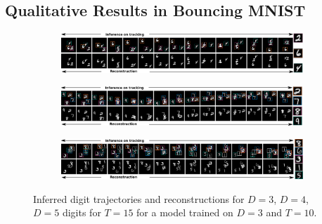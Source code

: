 \documentclass[anonymous=false, %
               format=acmsmall, %
               review=true, %
               screen=true, %
               nonacm=true]{acmart}
\theoremstyle{definition}
\begin{document}
\subsection{Qualitative Results in Bouncing MNIST}
\label{appendix:samples-mnnist}
\begin{figure}[!h]
  \centering
  \begin{subfigure}[t]{1.0\textwidth}
  \includegraphics[width=1.0\textwidth]{figures/bmnist-3digits-samples.pdf}
  \end{subfigure}
  \begin{subfigure}[t]{1.0\textwidth}
  \includegraphics[width=1.0\textwidth]{figures/bmnist-4digits-samples.pdf}
  \end{subfigure}
  \begin{subfigure}[t]{1.0\textwidth}
  \includegraphics[width=1.0\textwidth]{figures/bmnist-5digits-samples.pdf}
  \end{subfigure}
  \caption{Inferred digit trajectories and reconstructions for $D = 3$, $D = 4$, $D = 5$ digits for $T = 15$ for a model trained on $D = 3$ and $T = 10$.}
\end{figure}
\end{document}
